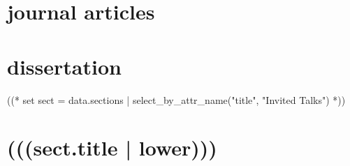 \documentclass[10pt,oneside]{article}
\begin{document}
%
%


\section{journal articles}

\mbox{}\vspace{-\dimexpr\baselineskip\relax}
\vspace*{-1em}

\printbibliography[type=article, heading=none]

\section{dissertation}

\mbox{}\vspace{-\dimexpr\baselineskip\relax}
\vspace*{-1em}
\printbibliography[type=thesis, heading=none]



((* set sect = data.sections | select_by_attr_name("title", "Invited Talks") *))
\section{(((sect.title | lower)))}
\end{document}
